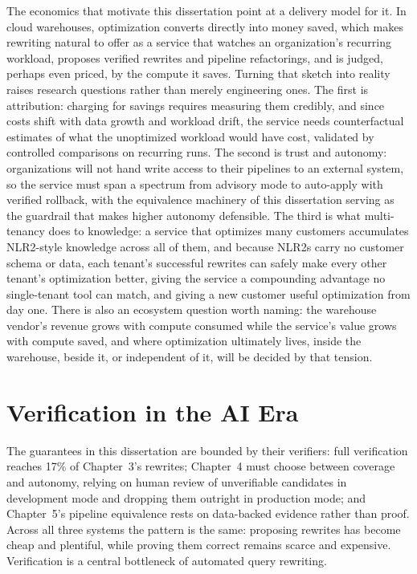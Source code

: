 The economics that motivate this dissertation point at a delivery
model for it. In cloud warehouses, optimization converts directly
into money saved, which makes rewriting natural to offer as a
service that watches an organization's recurring workload, proposes
verified rewrites and pipeline refactorings, and is judged, perhaps
even priced, by the compute it saves. Turning that sketch into
reality raises research questions rather than merely engineering
ones. The first is attribution: charging for savings requires
measuring them credibly, and since costs shift with data growth and
workload drift, the service needs counterfactual estimates of what
the unoptimized workload would have cost, validated by controlled
comparisons on recurring runs. The second is trust and autonomy:
organizations will not hand write access to their pipelines to an
external system, so the service must span a spectrum from advisory
mode to auto-apply with verified rollback, with the equivalence
machinery of this dissertation serving as the guardrail that makes
higher autonomy defensible. The third is what multi-tenancy does to
knowledge: a service that optimizes many customers accumulates
NLR2-style knowledge across all of them, and because NLR2s carry no
customer schema or data, each tenant's successful rewrites can
safely make every other tenant's optimization better, giving the
service a compounding advantage no single-tenant tool can match, and
giving a new customer useful optimization from day one. There is
also an ecosystem question worth naming: the warehouse vendor's
revenue grows with compute consumed while the service's value grows
with compute saved, and where optimization ultimately lives, inside
the warehouse, beside it, or independent of it, will be decided by
that tension.


\section{Verification in the AI Era}
\label{sec:fw:verification}

The guarantees in this dissertation are bounded by their verifiers:
full verification reaches 17\% of Chapter~3's rewrites; Chapter~4
must choose between coverage and autonomy, relying on human review of
unverifiable candidates in development mode and dropping them outright
in production mode; and Chapter~5's pipeline equivalence rests on
data-backed evidence rather than proof. Across all three systems the pattern is the same: proposing
rewrites has become cheap and plentiful, while proving them correct
remains scarce and expensive. Verification is a central bottleneck of
automated query rewriting.

